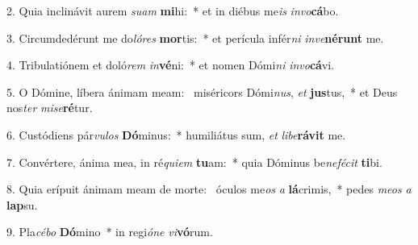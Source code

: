 2. Quia inclinávit aurem \textit{su}\textit{am} \textbf{mi}hi:~*  et in diébus me\textit{is} \textit{in}\textit{vo}\textbf{cá}bo.\

3. Circumdedérunt me do\textit{ló}\textit{res} \textbf{mor}tis:~*  et perícula infér\textit{ni} \textit{in}\textit{ve}\textbf{né}\textbf{runt} me.\

4. Tribulatiónem et doló\textit{rem} \textit{in}\textbf{vé}ni:~*  et nomen Dómi\textit{ni} \textit{in}\textit{vo}\textbf{cá}vi.\

5. O Dómine, líbera ánimam meam: \dag\  miséricors Dómi\textit{nus}, \textit{et} \textbf{jus}tus,~*  et Deus nos\textit{ter} \textit{mi}\textit{se}\textbf{ré}tur.\

6. Custódiens pár\textit{vu}\textit{los} \textbf{Dó}minus:~*  humiliátus sum, \textit{et} \textit{li}\textit{be}\textbf{rá}\textbf{vit} me.\

7. Convértere, ánima mea, in ré\textit{qui}\textit{em} \textbf{tu}am:~*  quia Dóminus be\textit{ne}\textit{fé}\textit{cit} \textbf{ti}bi.\

8. Quia erípuit ánimam meam de morte: \dag\  óculos me\textit{os} \textit{a} \textbf{lá}crimis,~*  pedes \textit{me}\textit{os} \textit{a} \textbf{lap}su.\

9. Pla\textit{cé}\textit{bo} \textbf{Dó}mino~*  in regi\textit{ó}\textit{ne} \textit{vi}\textbf{vó}rum.\


